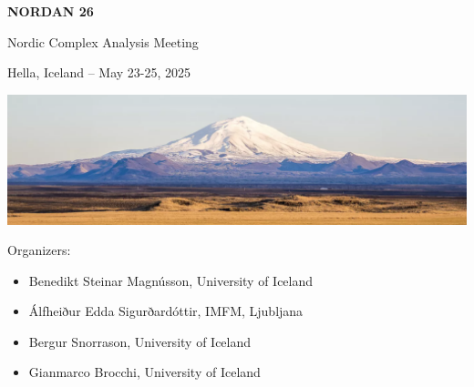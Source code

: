 \documentclass[12pt,openany]{report}      %
\def\TITLE{NORDAN 26}
\def\SUBTITLE{Nordic Complex Analysis Meeting}
\def\LOCATION{Hella, Iceland -- May 23-25, 2025}
\begin{document}
\begin{titlepage}
	\centering
    {\textbf{\textsf{\fontsize{63}{18}\selectfont \TITLE}}\par}
	\vspace{0.5cm}
	{\Huge \textsf{\SUBTITLE}\par}
	\vspace{0.5cm}
	{\Large \LOCATION\par}
	\vspace{2cm}
	\vfill
    \includegraphics[width=1\textwidth]{cover}\par\vspace{1cm}
\end{titlepage}

\newpage
\begin{center} 
    \noindent{}
\end{center}
    
\vfill

Organizers:
\begin{itemize}
    \item Benedikt Steinar Magnússon, University of Iceland
    \item Álfheiður Edda Sigurðardóttir, IMFM, Ljubljana
    \item Bergur Snorrason, University of Iceland
    \item Gianmarco Brocchi, University of Iceland
\end{itemize}



\newpage
\end{document}
